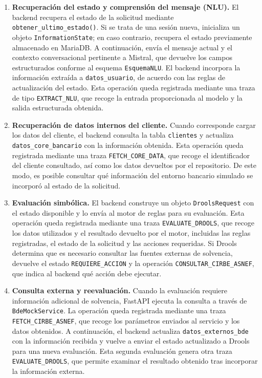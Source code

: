 \documentclass[12pt,a4paper]{report}
\begin{document}
\begin{enumerate}
    \item \textbf{Recuperación del estado y comprensión del mensaje (NLU).} El backend recupera el estado de la solicitud mediante \texttt{obtener\_ultimo\_estado()}. Si se trata de una sesión nueva, inicializa un objeto \texttt{InformationState}; en caso contrario, recupera el estado previamente almacenado en MariaDB. A continuación, envía el mensaje actual y el contexto conversacional pertinente a Mistral, que devuelve los campos estructurados conforme al esquema \texttt{EsquemaNLU}. El backend incorpora la información extraída a \texttt{datos\_usuario}, de acuerdo con las reglas de actualización del estado. Esta operación queda registrada mediante una traza de tipo \texttt{EXTRACT\_NLU}, que recoge la entrada proporcionada al modelo y la salida estructurada obtenida.

    \item \textbf{Recuperación de datos internos del cliente.} Cuando corresponde cargar los datos del cliente, el backend consulta la tabla \texttt{clientes} y actualiza \texttt{datos\_core\_bancario} con la información obtenida. Esta operación queda registrada mediante una traza \texttt{FETCH\_CORE\_DATA}, que recoge el identificador del cliente consultado, así como los datos devueltos por el repositorio. De este modo, es posible consultar qué información del entorno bancario simulado se incorporó al estado de la solicitud.

    \item \textbf{Evaluación simbólica.} El backend construye un objeto \texttt{DroolsRequest} con el estado disponible y lo envía al motor de reglas para su evaluación. Esta operación queda registrada mediante una traza \texttt{EVALUATE\_DROOLS}, que recoge los datos utilizados y el resultado devuelto por el motor, incluidas las reglas registradas, el estado de la solicitud y las acciones requeridas. Si Drools determina que es necesario consultar las fuentes externas de solvencia, devuelve el estado \texttt{REQUIERE\_ACCION} y la operación \texttt{CONSULTAR\_CIRBE\_ASNEF}, que indica al backend qué acción debe ejecutar.
    
    \item \textbf{Consulta externa y reevaluación.} Cuando la evaluación requiere información adicional de solvencia, FastAPI ejecuta la consulta a través de \texttt{BdeMockService}. La operación queda registrada mediante una traza \texttt{FETCH\_CIRBE\_ASNEF}, que recoge los parámetros enviados al servicio y los datos obtenidos. A continuación, el backend actualiza \texttt{datos\_externos\_bde} con la información recibida y vuelve a enviar el estado actualizado a Drools para una nueva evaluación. Esta segunda evaluación genera otra traza \texttt{EVALUATE\_DROOLS}, que permite examinar el resultado obtenido tras incorporar la información externa.
    

\end{enumerate}
\end{document}
